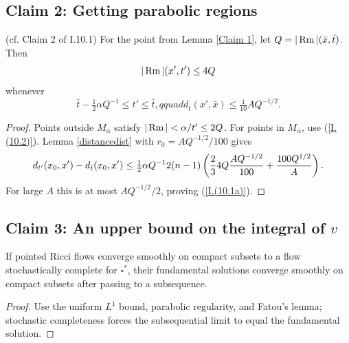 \subsection{Claim 2: Getting parabolic regions}
\begin{lemma}
  \label{lem:kl-getting-parabolic-regions-getting-parabolic-regions-lemma}
  (cf. Claim 2 of I.10.1) \label{Claim 2}
For the point from Lemma \ref{Claim 1}, let $Q=|\operatorname{Rm}|(\bar x,\bar t)$. Then
\begin{equation}\label{I.(10.1a)}|\operatorname{Rm}|(x',t')\le4Q\end{equation}
whenever
\begin{equation}\label{I.(10.3)}\bar t-\tfrac12\alpha Q^{-1}\le t'\le\bar t,qquad
d_{\bar t}(x',\bar x)\le\tfrac1{10}AQ^{-1/2}.
\end{equation}
\end{lemma}
\begin{proof}
\sketch
Points outside $M_\alpha$ satisfy $|\operatorname{Rm}|<\alpha/t'\le2Q$. For points in $M_\alpha$,
use (\ref{I.(10.2)}). Lemma \ref{distancedist} with
$r_0=AQ^{-1/2}/100$ gives
\begin{equation}\label{32.4}
d_{t'}(x_0,x')-d_{\bar t}(x_0,x')\le\tfrac12\alpha Q^{-1}2(n-1)\left({2\over3}4Q{AQ^{-1/2}\over100}+{100Q^{1/2}\over A}\right).
\end{equation}
For large $A$ this is at most $AQ^{-1/2}/2$, proving (\ref{I.(10.1a)}).
\end{proof}

\subsection{Claim 3: An upper bound on the integral of $v$}
 \label{Claim3}
\begin{lemma}
  \label{lem:kl-upper-bound-integral-integral-bound-pseudolocality}
  \label{stoccomplete}
If pointed Ricci flows converge smoothly on compact subsets to a flow stochastically
complete for $\square^*$, their fundamental solutions converge smoothly on compact
subsets after passing to a subsequence.
\end{lemma}
\begin{proof}
\sketch
Use the uniform $L^1$ bound, parabolic regularity, and Fatou's lemma; stochastic
completeness forces the subsequential limit to equal the fundamental solution.
\end{proof}

